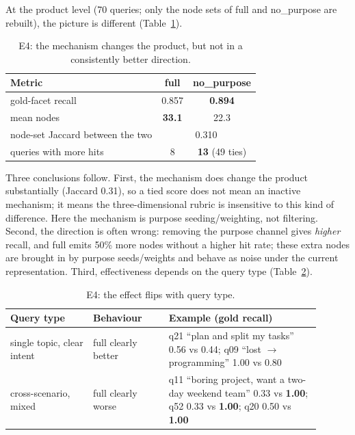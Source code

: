 \documentclass[11pt]{article}
\begin{document}
At the product level (70 queries; only the node sets of full and no\_purpose are rebuilt), the
picture is different (Table~\ref{tab:e4product}).

\begin{table}[t]
  \centering
  \small
  \begin{tabular}{@{}lcc@{}}
    \toprule
    Metric & full & no\_purpose \\
    \midrule
    gold-facet recall & 0.857 & \textbf{0.894} \\
    mean nodes & \textbf{33.1} & 22.3 \\
    node-set Jaccard between the two & \multicolumn{2}{c}{0.310} \\
    queries with more hits & 8 & \textbf{13} (49 ties) \\
    \bottomrule
  \end{tabular}
  \caption{E4: the mechanism changes the product, but not in a consistently better direction.}
  \label{tab:e4product}
\end{table}

Three conclusions follow. First, the mechanism does change the product substantially (Jaccard
0.31), so a tied score does not mean an inactive mechanism; it means the three-dimensional rubric
is insensitive to this kind of difference. Here the mechanism is purpose seeding/weighting, not
filtering. Second, the direction is often wrong: removing the purpose channel gives \emph{higher}
recall, and full emits 50\% more nodes without a higher hit rate; these extra nodes are brought in
by purpose seeds/weights and behave as noise under the current representation. Third, effectiveness
depends on the query type (Table~\ref{tab:e4types}).

\begin{table}[t]
  \centering
  \small
  \begin{tabular}{@{}p{0.24\linewidth}p{0.22\linewidth}p{0.44\linewidth}@{}}
    \toprule
    Query type & Behaviour & Example (gold recall) \\
    \midrule
    single topic, clear intent & full clearly better & q21 ``plan and split my tasks''
      0.56 vs 0.44; q09 ``lost $\rightarrow$ programming'' 1.00 vs 0.80 \\
    cross-scenario, mixed & full clearly worse & q11 ``boring project, want a two-day weekend
      team'' 0.33 vs \textbf{1.00}; q52 0.33 vs \textbf{1.00}; q20 0.50 vs \textbf{1.00} \\
    \bottomrule
  \end{tabular}
  \caption{E4: the effect flips with query type.}\label{tab:e4types}
\end{table}
\end{document}
